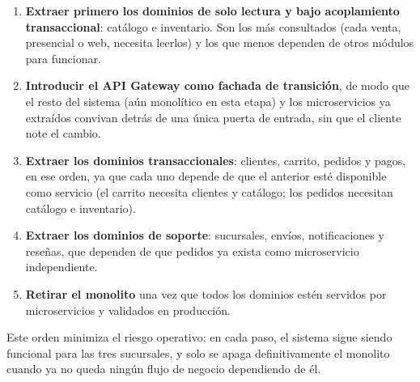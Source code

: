 \begin{enumerate}
    \item \textbf{Extraer primero los dominios de solo lectura y bajo acoplamiento
    transaccional}: catálogo e inventario. Son los más consultados (cada venta,
    presencial o web, necesita leerlos) y los que menos dependen de otros módulos para
    funcionar.
    \item \textbf{Introducir el API Gateway como fachada de transición}, de modo que
    el resto del sistema (aún monolítico en esta etapa) y los microservicios ya
    extraídos convivan detrás de una única puerta de entrada, sin que el cliente note
    el cambio.
    \item \textbf{Extraer los dominios transaccionales}: clientes, carrito, pedidos y
    pagos, en ese orden, ya que cada uno depende de que el anterior esté disponible
    como servicio (el carrito necesita clientes y catálogo; los pedidos necesitan
    catálogo e inventario).
    \item \textbf{Extraer los dominios de soporte}: sucursales, envíos, notificaciones
    y reseñas, que dependen de que pedidos ya exista como microservicio independiente.
    \item \textbf{Retirar el monolito} una vez que todos los dominios estén servidos
    por microservicios y validados en producción.
\end{enumerate}

Este orden minimiza el riesgo operativo: en cada paso, el sistema sigue siendo
funcional para las tres sucursales, y solo se apaga definitivamente el monolito cuando
ya no queda ningún flujo de negocio dependiendo de él.
